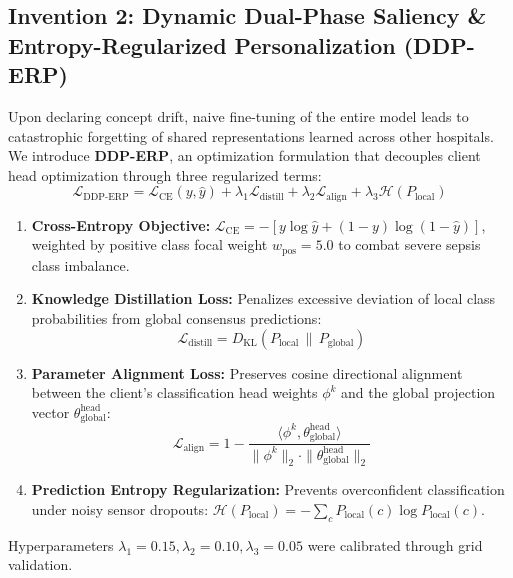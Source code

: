 \documentclass[journal,twocolumn,10pt]{IEEEtran}
\begin{document}
\subsection{Invention 2: Dynamic Dual-Phase Saliency \& Entropy-Regularized Personalization (DDP-ERP)}
Upon declaring concept drift, naive fine-tuning of the entire model leads to catastrophic forgetting of shared representations learned across other hospitals. We introduce \textbf{DDP-ERP}, an optimization formulation that decouples client head optimization through three regularized terms:
\begin{equation}
\mathcal{L}_{\text{DDP-ERP}} = \mathcal{L}_{\text{CE}}(y, \hat{y}) + \lambda_1 \mathcal{L}_{\text{distill}} + \lambda_2 \mathcal{L}_{\text{align}} + \lambda_3 \mathcal{H}(P_{\text{local}})
\end{equation}
\begin{enumerate}
    \item \textbf{Cross-Entropy Objective:} $\mathcal{L}_{\text{CE}} = - [y \log \hat{y} + (1-y) \log(1 - \hat{y})]$, weighted by positive class focal weight $w_{\text{pos}} = 5.0$ to combat severe sepsis class imbalance.
    \item \textbf{Knowledge Distillation Loss:} Penalizes excessive deviation of local class probabilities from global consensus predictions:
    \begin{equation}
    \mathcal{L}_{\text{distill}} = D_{\text{KL}}\left(P_{\text{local}} \,\|\, P_{\text{global}}\right)
    \end{equation}
    \item \textbf{Parameter Alignment Loss:} Preserves cosine directional alignment between the client's classification head weights $\phi^k$ and the global projection vector $\theta_{\text{global}}^{\text{head}}$:
    \begin{equation}
    \mathcal{L}_{\text{align}} = 1 - \frac{\langle \phi^k, \theta_{\text{global}}^{\text{head}} \rangle}{\|\phi^k\|_2 \cdot \|\theta_{\text{global}}^{\text{head}}\|_2}
    \end{equation}
    \item \textbf{Prediction Entropy Regularization:} Prevents overconfident classification under noisy sensor dropouts: $\mathcal{H}(P_{\text{local}}) = - \sum_{c} P_{\text{local}}(c) \log P_{\text{local}}(c)$.
\end{enumerate}
Hyperparameters $\lambda_1 = 0.15, \lambda_2 = 0.10, \lambda_3 = 0.05$ were calibrated through grid validation.
\end{document}
